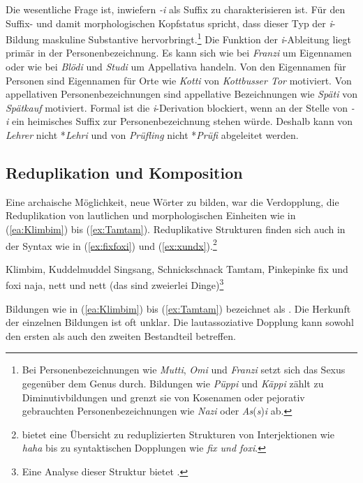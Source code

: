 Die wesentliche Frage ist, inwiefern \textit{-i} als Suffix zu charakterisieren ist. Für den Suffix- und damit morphologischen Kopfstatus spricht, dass dieser Typ der \textit{i}-Bildung maskuline Substantive hervorbringt.\footnote{Bei Personenbezeichnungen wie \textit{Mutti}, \textit{Omi} und \textit{Franzi} setzt sich das Sexus gegenüber dem Genus durch. Bildungen wie \textit{Püppi} und \textit{Käppi} zählt \citet[304]{Koepcke2003} zu Diminutivbildungen und grenzt sie von Kosenamen oder pejorativ gebrauchten Personenbezeichnungen wie \textit{Nazi} oder \textit{As}(\textit{s})\textit{i} ab.} Die Funktion der \textit{i}-Ableitung liegt primär in der Personenbezeichnung. Es kann sich wie bei \textit{Franzi} um Eigennamen oder wie bei \textit{Blödi} und \textit{Studi} um Appellativa handeln. Von den Eigennamen für Personen sind Eigennamen für Orte wie \textit{Kotti} von \textit{Kottbusser Tor} motiviert. Von appellativen Personenbezeichnungen sind appellative Bezeichnungen wie \textit{Späti} von \textit{Spätkauf} motiviert. Formal ist die \textit{i}-Derivation blockiert, wenn an der Stelle von \textit{-i} ein heimisches Suffix zur Personenbezeichnung stehen würde. Deshalb kann von \textit{Lehrer} nicht *\textit{Lehri} und von \textit{Prüfling} nicht *\textit{Prüfi} abgeleitet werden.

\subsection{Reduplikation und Komposition}\label{subsection:Resuplikation}
\largerpage
Eine archaische Möglichkeit, neue Wörter zu bilden, war die Verdopplung, die Reduplikation von lautlichen und morphologischen Einheiten wie in (\ref{ea:Klimbim}) bis (\ref{ex:Tamtam}). Reduplikative Strukturen finden sich auch in der Syntax wie in (\ref{ex:fixfoxi}) und (\ref{ex:xundx}).\footnote{\citet[236]{Kentner2017} bietet eine Übersicht zu reduplizierten Strukturen von Interjektionen wie \textit{haha} bis zu syntaktischen Dopplungen wie \textit{fix und foxi}.}

\ea \label{ea:Reduplikation}
\ea \label{ea:Klimbim} Klimbim, Kuddelmuddel
\ex \label{ex:Singsang} Singsang, Schnickschnack
\ex \label{ex:Tamtam} Tamtam, Pinkepinke
\ex \label{ex:fixfoxi} fix und foxi
\ex \label{ex:xundx} naja, nett und nett (das sind zweierlei Dinge)\footnote{Eine Analyse dieser Struktur bietet \citet{Finkbeiner2012}.}
\z 
\z 

Bildungen wie in (\ref{ea:Klimbim}) bis (\ref{ex:Tamtam}) bezeichnet \citet[470]{Donalies2009Wortbildung} als . Die Herkunft der einzelnen Bildungen ist oft unklar. Die lautassoziative Dopplung kann sowohl den ersten als auch den zweiten Bestandteil betreffen.

